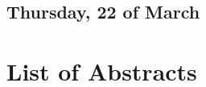 \documentclass[
	openany, %
	parskip=false, %
	12pt, %
	a4paper, %
]{conferencebooklet} %
\begin{document}

\section{Thursday, 22 of March}




\chapter{List of Abstracts}

%













\end{document}
